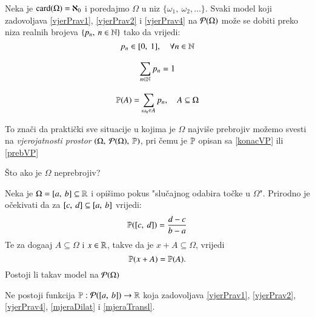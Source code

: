 \begin{pr} \label{primjer14}
    Neka je $\textnormal{card}({\Omega}) = \aleph_0$ i poredajmo $\Omega$ u niz
    $\{ \omega_1, \: \omega_2, \dots \}$. Svaki model koji
    zadovoljava \eqref{vjerPrav1}, \eqref{vjerPrav2} i
    \eqref{vjerPrav4} na $\mathcal{P}({\Omega})$ mo\v ze se dobiti
    preko niza realnih brojeva $\{p_n, \: n \in \mathbb{N} \}$ tako da
    vrijedi:
    \begin{equation}   %
        p_n \in [0, \: 1], \quad \forall n \in \N
    \end{equation}

    \begin{equation}
        \sum\limits_{n \in \mathbb{N}}^{} p_n = 1
    \end{equation}

    \begin{equation} \label{prebVP}
        \mathbb{P}({A}) = \sum\limits_{\omega_n \in A}^{} p_n, \quad A
            \subseteq \Omega
    \end{equation}
\end{pr}

To zna\v ci da prakti\v cki sve situacije u kojima je $\Omega$ najvi\v se
prebrojiv mo\v zemo svesti na \emph{vjerojatnosti prostor} $(\Omega,
\: \mathcal{P}({\Omega}), \: \mathbb{P})$, pri \v cemu je $\mathbb{P}$ opisan
sa \eqref{konacVP} ili \eqref{prebVP}

\v Sto ako je $\Omega$ neprebrojiv?

\begin{pr}  \label{primjer1.18}
    Neka je $\Omega = [{a}, \:{b}] \subseteq \mathbb{R}$ i opi\v simo pokus
    "slu\v cajnog odabira to\v cke u $\Omega$". Prirodno je
    o\v cekivati da za $[{c}, \:{d}] \subseteq [{a}, \:{b}]$ vrijedi:
    \begin{equation} \label{mjeraDilat}
        \mathbb{P}({[{c}, \:{d}]}) = \frac{d - c}{b - a}
    \end{equation}
    Te za doga\dj aj $A \subseteq \Omega$ i $x \in \mathbb{R}$, takve da je
    $x + A \subseteq \Omega$, vrijedi
    \begin{equation} \label{mjeraTransl}
        \mathbb{P}({x + A}) = \mathbb{P}({A}).
    \end{equation}
    Postoji li takav model na $\mathcal{P}({\Omega})$
\end{pr}

\begin{tm}
    Ne postoji funkcija $\mathbb{P}: \mathcal{P}({[{a}, \:{b}]}) \to \mathbb{R}$
    koja zadovoljava \eqref{vjerPrav1}, \eqref{vjerPrav2},
    \eqref{vjerPrav4}, \eqref{mjeraDilat} i \eqref{mjeraTransl}.
\end{tm}

